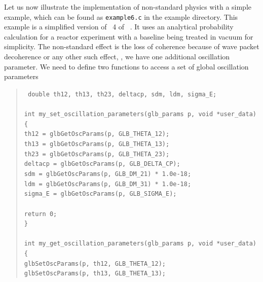 Let us now illustrate the implementation of non-standard physics with a simple example, which can
be found as {\tt example6.c} in the example directory.
This example is a simplified version of \Sec~4 of 
\Ref~\cite{Blennow:2005yk}.
It uses an analytical probability calculation for a reactor experiment with a baseline being treated
in vacuum for simplicity. The non-standard effect is the loss of coherence because of wave packet decoherence
or any other such effect, \ie, we have one additional oscillation parameter. We need to define two functions to access a set of 
global oscillation parameters
\begin{quote}
{\tt 
double th12, th13, th23, deltacp, sdm, ldm, sigma\_E; \\
\\
int my\_set\_oscillation\_parameters(glb\_params p, void *user\_data) \\
\{ \\
 \hspace*{0.5cm} th12    = glbGetOscParams(p, GLB\_THETA\_12); \\
 \hspace*{0.5cm} th13    = glbGetOscParams(p, GLB\_THETA\_13); \\
 \hspace*{0.5cm} th23    = glbGetOscParams(p, GLB\_THETA\_23); \\
 \hspace*{0.5cm} deltacp = glbGetOscParams(p, GLB\_DELTA\_CP); \\
 \hspace*{0.5cm} sdm     = glbGetOscParams(p, GLB\_DM\_21) * 1.0e-18;  \\
 \hspace*{0.5cm} ldm     = glbGetOscParams(p, GLB\_DM\_31) * 1.0e-18;  \\
 \hspace*{0.5cm} sigma\_E = glbGetOscParams(p, GLB\_SIGMA\_E); \\
\\
  return 0; \\
\} \\
\\
int my\_get\_oscillation\_parameters(glb\_params p, void *user\_data) \\
\{ \\
  \hspace*{0.5cm} glbSetOscParams(p, th12, GLB\_THETA\_12); \\
  \hspace*{0.5cm} glbSetOscParams(p, th13, GLB\_THETA\_13); \\
}
\end{quote}
